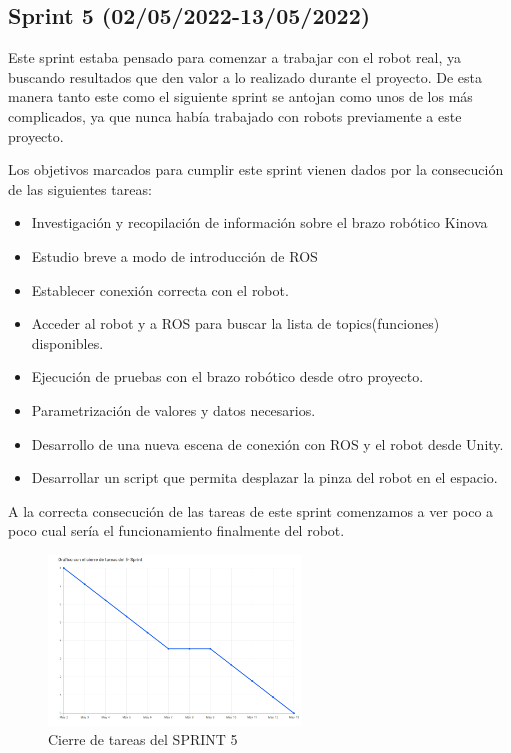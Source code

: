 \subsection{\textbf{Sprint 5 (02/05/2022-13/05/2022)}}
Este sprint estaba pensado para comenzar a trabajar con el robot real, ya buscando resultados que den valor a lo realizado durante el proyecto. De esta manera tanto este como el siguiente sprint se antojan como unos de los más complicados, ya que nunca había trabajado con robots previamente a este proyecto.

Los objetivos marcados para cumplir este sprint vienen dados por la consecución de las siguientes tareas:
\begin{itemize}
    \item Investigación y recopilación de información sobre el brazo robótico Kinova
    \item Estudio breve a modo de introducción de ROS \cite{ROS}
    \item Establecer conexión correcta con el robot.
    \item Acceder al robot y a ROS para buscar la lista de topics(funciones) disponibles.
    \item Ejecución de pruebas con el brazo robótico desde otro proyecto.
    \item Parametrización de valores y datos necesarios.
    \item Desarrollo de una nueva escena de conexión con ROS y el robot desde Unity.
    \item Desarrollar un script que permita desplazar la pinza del robot en el espacio.
\end{itemize}

A la correcta consecución de las tareas de este sprint comenzamos a ver poco a poco cual sería el funcionamiento finalmente del robot. 


\begin{figure}[h]
\centering
\label{Cierre de tareas del SPRINT 5}
\includegraphics[width=0.6\textwidth]{img/sprint5.PNG}
\caption{Cierre de tareas del SPRINT 5}
\end{figure}
